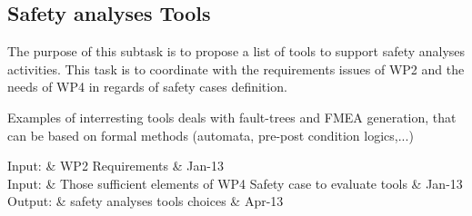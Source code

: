 \documentclass{template/openetcs_article}
\begin{document}
%
% 
%

\subsection{Safety analyses Tools}


The purpose of this subtask is to propose a list of tools to  support  safety  analyses activities. This task  is to  coordinate with  the requirements issues of WP2 and the needs of WP4 in regards of safety cases definition.

Examples of interresting tools deals with fault-trees and FMEA generation, that can be based on formal methods (automata, pre-post condition logics,...) 
  
 
\begin{inoutput}
Input: & WP2 Requirements & Jan-13 \\
Input: & Those sufficient elements of WP4 Safety case to evaluate tools & Jan-13 \\
\hline
Output: & safety analyses tools choices & Apr-13 \\
\end{inoutput}



\end{document}
